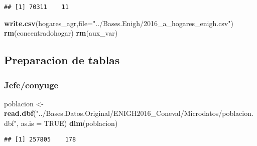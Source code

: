 \documentclass[11pt,]{article}
\newenvironment{Shaded}{\begin{snugshade}}{\end{snugshade}}
\newcommand{\KeywordTok}[1]{\textcolor[rgb]{0.13,0.29,0.53}{\textbf{#1}}}
\newcommand{\DataTypeTok}[1]{\textcolor[rgb]{0.13,0.29,0.53}{#1}}
\newcommand{\DecValTok}[1]{\textcolor[rgb]{0.00,0.00,0.81}{#1}}
\newcommand{\StringTok}[1]{\textcolor[rgb]{0.31,0.60,0.02}{#1}}
\newcommand{\CommentTok}[1]{\textcolor[rgb]{0.56,0.35,0.01}{\textit{#1}}}
\newcommand{\OtherTok}[1]{\textcolor[rgb]{0.56,0.35,0.01}{#1}}
\newcommand{\OperatorTok}[1]{\textcolor[rgb]{0.81,0.36,0.00}{\textbf{#1}}}
\newcommand{\NormalTok}[1]{#1}
\begin{document}
\begin{verbatim}
## [1] 70311    11
\end{verbatim}

\begin{Shaded}
\begin{Highlighting}[]
\KeywordTok{write.csv}\NormalTok{(hogares_agr,}\DataTypeTok{file=}\StringTok{"../Bases.Enigh/2016_a_hogares_enigh.csv"}\NormalTok{)}
\KeywordTok{rm}\NormalTok{(concentradohogar)}
\KeywordTok{rm}\NormalTok{(aux_var)}
\end{Highlighting}
\end{Shaded}

\subsection{Preparacion de tablas}\label{preparacion-de-tablas}

\subsubsection{Jefe/conyuge}\label{jefeconyuge}

\begin{Shaded}
\begin{Highlighting}[]
\NormalTok{poblacion <-}\StringTok{ }\KeywordTok{read.dbf}\NormalTok{(}\StringTok{"../Bases.Datos.Original/ENIGH2016_Coneval/Microdatos/poblacion.dbf"}\NormalTok{, }
                       \DataTypeTok{as.is =} \OtherTok{TRUE}\NormalTok{)}
\KeywordTok{dim}\NormalTok{(poblacion)}
\end{Highlighting}
\end{Shaded}

\begin{verbatim}
## [1] 257805    178
\end{verbatim}

\begin{Shaded}
\end{Shaded}
\end{document}
